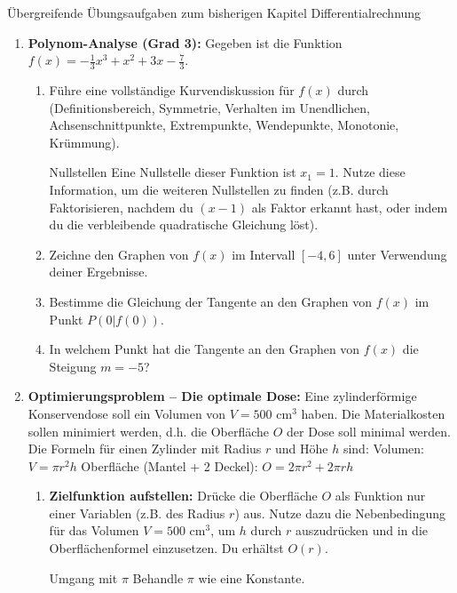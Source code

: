 \begin{aufgabenumgebung}[A:DiffUebergreifend]{Übergreifende Übungsaufgaben zum bisherigen Kapitel Differentialrechnung}
\begin{enumerate}
    \item \textbf{Polynom-Analyse (Grad 3):}
        Gegeben ist die Funktion $f(x) = -\frac{1}{3}x^3 + x^2 + 3x - \frac{7}{3}$.
        \begin{enumerate}
            \item Führe eine vollständige Kurvendiskussion für $f(x)$ durch (Definitionsbereich, Symmetrie, Verhalten im Unendlichen, Achsenschnittpunkte, Extrempunkte, Wendepunkte, Monotonie, Krümmung).
            \begin{tippumgebung}{Nullstellen}
            Eine Nullstelle dieser Funktion ist $x_1=1$. Nutze diese Information, um die weiteren Nullstellen zu finden (z.B. durch Faktorisieren, nachdem du $(x-1)$ als Faktor erkannt hast, oder indem du die verbleibende quadratische Gleichung löst).
            \end{tippumgebung}
            \item Zeichne den Graphen von $f(x)$ im Intervall $[-4, 6]$ unter Verwendung deiner Ergebnisse.
            \item Bestimme die Gleichung der Tangente an den Graphen von $f(x)$ im Punkt $P(0|f(0))$.
            \item In welchem Punkt hat die Tangente an den Graphen von $f(x)$ die Steigung $m=-5$?
        \end{enumerate}
    \item \textbf{Optimierungsproblem – Die optimale Dose:}
        Eine zylinderförmige Konservendose soll ein Volumen von $V = 500 \text{ cm}^3$ haben. Die Materialkosten sollen minimiert werden, d.h. die Oberfläche $O$ der Dose soll minimal werden.
        Die Formeln für einen Zylinder mit Radius $r$ und Höhe $h$ sind:
        Volumen: $V = \pi r^2 h$
        Oberfläche (Mantel + 2 Deckel): $O = 2\pi r^2 + 2\pi r h$
        \begin{enumerate}
            \item \textbf{Zielfunktion aufstellen:} Drücke die Oberfläche $O$ als Funktion nur einer Variablen (z.B. des Radius $r$) aus. Nutze dazu die Nebenbedingung für das Volumen $V=500 \text{ cm}^3$, um $h$ durch $r$ auszudrücken und in die Oberflächenformel einzusetzen. Du erhältst $O(r)$.
            \begin{tippumgebung}{Umgang mit $\pi$}
            Behandle $\pi$ wie eine Konstante.

\end{tippumgebung}
\end{enumerate}
\end{enumerate}
\end{aufgabenumgebung}
